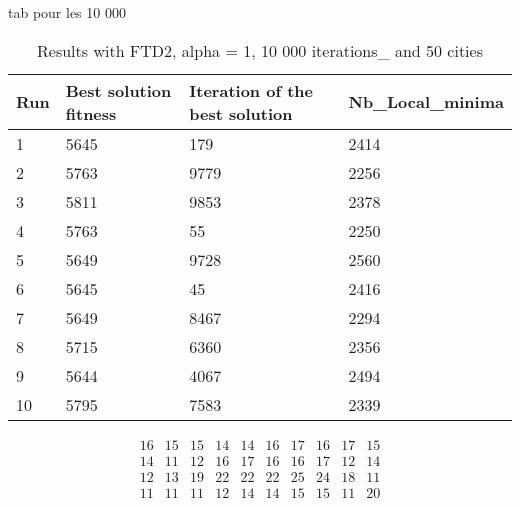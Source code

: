 \documentclass[12pt,oneside,a4paper]{article}
\begin{document}
tab pour les 10 000
\begin{table}[h]
  \centering
  \small
  \begin{tabular}{llll}
    \hline
    \multicolumn{1}{|l|}{\textbf{Run}}& \multicolumn{1}{l|}{\textbf{Best solution fitness}}& \multicolumn{1}{l|}{\textbf{Iteration of the best solution}}& \multicolumn{1}{l|}{\textbf{Nb\_Local\_minima}}\\ \hline
    \multicolumn{1}{|l|}{1} & \multicolumn{1}{l|}{5645}  & \multicolumn{1}{l|}{179} & \multicolumn{1}{l|}{2414}  \\ \hline
    \multicolumn{1}{|l|}{2} & \multicolumn{1}{l|}{5763}  & \multicolumn{1}{l|}{9779} & \multicolumn{1}{l|}{2256}  \\ \hline
    \multicolumn{1}{|l|}{3} & \multicolumn{1}{l|}{5811}  & \multicolumn{1}{l|}{9853}  & \multicolumn{1}{l|}{2378}  \\ \hline
    \multicolumn{1}{|l|}{4} & \multicolumn{1}{l|}{5763}  & \multicolumn{1}{l|}{55}  & \multicolumn{1}{l|}{2250}  \\ \hline
    \multicolumn{1}{|l|}{5} & \multicolumn{1}{l|}{5649}  & \multicolumn{1}{l|}{9728}  & \multicolumn{1}{l|}{2560}  \\ \hline
    \multicolumn{1}{|l|}{6} & \multicolumn{1}{l|}{5645}  & \multicolumn{1}{l|}{45}  & \multicolumn{1}{l|}{2416}  \\ \hline
    \multicolumn{1}{|l|}{7} & \multicolumn{1}{l|}{5649}  & \multicolumn{1}{l|}{8467}  & \multicolumn{1}{l|}{2294}  \\ \hline
    \multicolumn{1}{|l|}{8} & \multicolumn{1}{l|}{5715}  & \multicolumn{1}{l|}{6360} & \multicolumn{1}{l|}{2356}  \\ \hline
    \multicolumn{1}{|l|}{9} & \multicolumn{1}{l|}{5644}  & \multicolumn{1}{l|}{4067} & \multicolumn{1}{l|}{2494}  \\ \hline
    \multicolumn{1}{|l|}{10} & \multicolumn{1}{l|}{5795}  & \multicolumn{1}{l|}{7583} & \multicolumn{1}{l|}{2339}  \\ \hline
  \end{tabular}
  \caption{Results with FTD2, alpha = 1, 10 000 iterations\_ and 50 cities}
\end{table}

\begin{equation}
  \tag{Mean Tabu Duration by city table 16}
  \begin{smallmatrix} 
16 & 15 & 15 & 14 & 14 & 16 & 17 & 16 & 17 & 15 \\
14 & 11 & 12 & 16 & 17 & 16 & 16 & 17 & 12 & 14 \\
12 & 13 & 19 & 22 & 22 & 22 & 25 & 24 & 18 & 11 \\
11 & 11 & 11 & 12 & 14 & 14 & 15 & 15 & 11 & 20
  \end{smallmatrix}
\end{equation}
\end{document}
